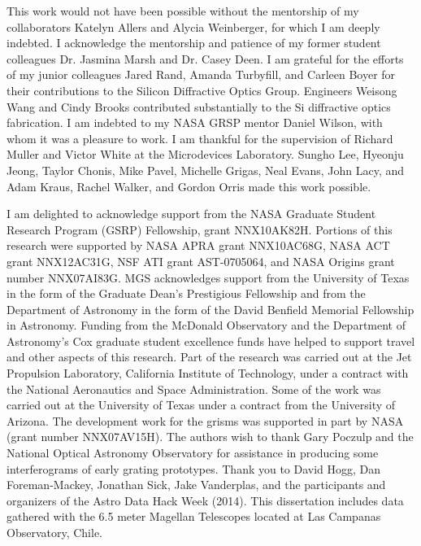 \documentclass[12pt]{report}	%
\begin{document}
\begin{acknowledgments}		%
%

This work would not have been possible without the mentorship of my collaborators Katelyn Allers and Alycia Weinberger, for which I am deeply indebted.  I acknowledge the mentorship and patience of my former student colleagues Dr. Jasmina Marsh and Dr. Casey Deen.  I am grateful for the efforts of my junior colleagues Jared Rand, Amanda Turbyfill, and Carleen Boyer for their contributions to the Silicon Diffractive Optics Group.  Engineers Weisong Wang and Cindy Brooks contributed substantially to the Si diffractive optics fabrication.  I am indebted to my NASA GRSP mentor Daniel Wilson, with whom it was a pleasure to work.  I am thankful for the supervision of Richard Muller and Victor White at the Microdevices Laboratory.  Sungho Lee, Hyeonju Jeong, Taylor Chonis, Mike Pavel, Michelle Grigas, Neal Evans, John Lacy, and Adam Kraus, Rachel Walker, and Gordon Orris made this work possible.

I am delighted to acknowledge support from the NASA Graduate Student Research Program (GSRP) Fellowship, grant NNX10AK82H.  Portions of this research were supported by NASA APRA grant NNX10AC68G, NASA ACT grant NNX12AC31G, NSF ATI grant AST-0705064, and NASA Origins grant number NNX07AI83G.  MGS acknowledges support from the University of Texas in the form of the Graduate Dean's Prestigious Fellowship and from the Department of Astronomy in the form of the David Benfield Memorial Fellowship in Astronomy.  Funding from the McDonald Observatory and the Department of Astronomy's Cox graduate student excellence funds have helped to support travel and other aspects of this research.  Part of the research was carried out at the Jet Propulsion Laboratory, California Institute of Technology, under a contract with the National Aeronautics and Space Administration.  Some of the work was carried out at the University of Texas under a contract from the University of Arizona.  The development work for the grisms was supported in part by NASA (grant number NNX07AV15H).  The authors wish to thank Gary Poczulp and the National Optical Astronomy Observatory for assistance in producing some interferograms of early grating prototypes.  Thank you to David Hogg, Dan Foreman-Mackey, Jonathan Sick, Jake Vanderplas, and the participants and organizers of the Astro Data Hack Week (2014).  This dissertation includes data gathered with the 6.5 meter Magellan Telescopes located at Las Campanas Observatory, Chile.


\end{acknowledgments}
\end{document}
